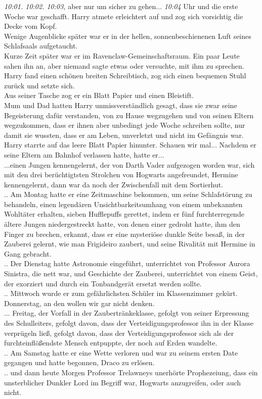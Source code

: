 {\emph{10:01. 10:02. 10:03,} aber nur um sicher zu gehen... \emph{10:04} Uhr und die erste Woche war geschafft. Harry atmete erleichtert auf und zog sich vorsichtig die Decke vom Kopf.\\ Wenige Augenblicke später war er in der hellen, sonnenbeschienenen Luft seines Schlafsaals aufgetaucht.\\ Kurze Zeit später war er im Ravenclaw-Gemeinschaftsraum. Ein paar Leute sahen ihn an, aber niemand sagte etwas oder versuchte, mit ihm zu sprechen.\\ Harry fand einen schönen breiten Schreibtisch, zog sich einen bequemen Stuhl zurück und setzte sich.\\ Aus seiner Tasche zog er ein Blatt Papier und einen Bleistift.\\ Mum und Dad hatten Harry unmissverständlich gesagt, dass sie zwar seine Begeisterung dafür verstanden, von zu Hause wegzugehen und von seinen Eltern wegzukommen, dass er ihnen aber unbedingt jede Woche schreiben sollte, nur damit sie wussten, dass er am Leben, unverletzt und nicht im Gefängnis war.\\ Harry starrte auf das leere Blatt Papier hinunter. Schauen wir mal... Nachdem er seine Eltern am Bahnhof verlassen hatte, hatte er...\\ ...einen Jungen kennengelernt, der von Darth Vader aufgezogen worden war, sich mit den drei berüchtigtsten Strolchen von Hogwarts angefreundet, Hermine kennengelernt, dann war da noch der Zwischenfall mit dem Sortierhut.\\ .. Am Montag hatte er eine Zeitmaschine bekommen, um seine Schlafstörung zu behandeln, einen legendären Unsichtbarkeitsumhang von einem unbekannten Wohltäter erhalten, sieben Hufflepuffs gerettet, indem er fünf furchterregende ältere Jungen niedergestreckt hatte, von denen einer gedroht hatte, ihm den Finger zu brechen, erkannt, dass er eine mysteriöse dunkle Seite besaß, in der Zauberei gelernt, wie man Frigideiro zaubert, und seine Rivalität mit Hermine in Gang gebracht.\\ .. Der Dienstag hatte Astronomie eingeführt, unterrichtet von Professor Aurora Sinistra, die nett war, und Geschichte der Zauberei, unterrichtet von einem Geist, der exorziert und durch ein Tonbandgerät ersetzt werden sollte.\\ .. Mittwoch wurde er zum gefährlichsten Schüler im Klassenzimmer gekürt. Donnerstag, an den wollen wir gar nicht denken.\\ ... Freitag, der Vorfall in der Zaubertränkeklasse, gefolgt von seiner Erpressung des Schulleiters, gefolgt davon, dass der Verteidigungsprofessor ihn in der Klasse verprügeln ließ, gefolgt davon, dass der Verteidigungsprofessor sich als der furchteinflößendste Mensch entpuppte, der noch auf Erden wandelte.\\ .. Am Samstag hatte er eine Wette verloren und war zu seinem ersten Date gegangen und hatte begonnen, Draco zu erlösen.\\ .. und dann heute Morgen Professor Trelawneys unerhörte Prophezeiung, dass ein unsterblicher Dunkler Lord im Begriff war, Hogwarts anzugreifen, oder auch nicht.

}
